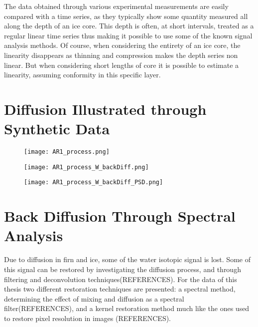 \documentclass[../../CompleteThesis2/Complete_2ndDraft]{subfiles}
\begin{document}
The data obtained through various experimental measurements are easily compared with a time series, as they typically show some quantity measured all along the depth of an ice core. This depth is often, at short intervals, treated as a regular linear time series thus making it possible to use some of the known signal analysis methods. Of course, when considering the entirety of an ice core, the linearity disappears as thinning and compression makes the depth series non linear. But when considering short lengths of core it is possible to estimate a linearity, assuming conformity in this specific layer. 


\section[Synthetic Data]{Diffusion Illustrated through Synthetic Data}
\label{Sec:SignalAnalysis_SyntheticData}
\begin{figure}[h]
	\centering
	\texttt{[image: AR1\_process.png]}
	\caption[]{}
	\label{fig:AR1_process}
\end{figure}

\begin{figure}[h]
	\centering
	\texttt{[image: AR1\_process\_W\_backDiff.png]}
	\caption[]{}
	\label{fig:AR1_process_W_backDiff}
\end{figure}

\begin{figure}[h]
	\centering
	\texttt{[image: AR1\_process\_W\_backDiff\_PSD.png]}
	\caption[]{}
	\label{fig:AR1_process_W_backDiff_PSD}
\end{figure}





\section[Back Diffusion][Back Diffusion]{Back Diffusion Through Spectral Analysis}
\label{Sec:SignalAnalysis_BackDiffusion}
Due to diffusion in firn and ice, some of the water isotopic signal is lost. Some of this signal can be restored by investigating the diffusion process, and through filtering and deconvolution techniques(REFERENCES).
For the data of this thesis two different restoration techniques are presented: a spectral method, determining the effect of mixing and diffusion as a spectral filter(REFERENCES), and a kernel restoration method much like the ones used to restore pixel resolution in images (REFERENCES). 
	
\end{document}
